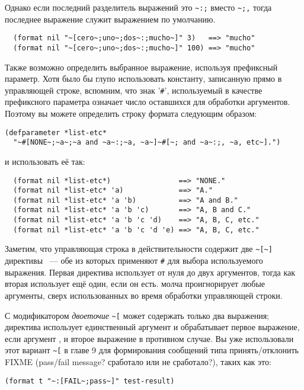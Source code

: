 {Однако если последний разделитель выражений это \lstinline!~:;! вместо \lstinline!~;,!
тогда последнее выражение служит выражением по умолчанию.

\begin{verbatim}
  (format nil "~[cero~;uno~;dos~:;mucho~]" 3)   ==> "mucho"
  (format nil "~[cero~;uno~;dos~:;mucho~]" 100) ==> "mucho"
\end{verbatim}

Также возможно определить выбранное выражение, используя префиксный параметр. Хотя было бы
глупо использовать константу, записанную прямо в управляющей строке, вспомним, что знак
'\lstinline!#!', используемый в качестве префиксного параметра означает число оставшихся
для обработки аргументов. Поэтому вы можете определить строку формата следующим образом:

\begin{lstlisting}
(defparameter *list-etc*
  "~#[NONE~;~a~;~a and ~a~:;~a, ~a~]~#[~; and ~a~:;, ~a, etc~].")
\end{lstlisting}

и использовать её так:

\begin{verbatim}
  (format nil *list-etc*)                ==> "NONE."
  (format nil *list-etc* 'a)             ==> "A."
  (format nil *list-etc* 'a 'b)          ==> "A and B."
  (format nil *list-etc* 'a 'b 'c)       ==> "A, B and C."
  (format nil *list-etc* 'a 'b 'c 'd)    ==> "A, B, C, etc."
  (format nil *list-etc* 'a 'b 'c 'd 'e) ==> "A, B, C, etc."
\end{verbatim}

Заметим, что управляющая строка в действительности содержит две \lstinline!~[~]! директивы
~--- обе из которых применяют \lstinline!#! для выбора используемого выражения. Первая
директива использует от нуля до двух аргументов, тогда как вторая использует ещё один,
если он есть.  молча проигнорирует любые аргументы, сверх использованных во
время обработки управляющей строки.

С модификатором \textit{двоеточие} \lstinline!~[! может содержать только два выражения;
директива использует единственный аргумент и обрабатывает первое выражение, если аргумент
, и второе выражение в противном случае. Вы уже использовали этот вариант
\lstinline!~[! в главе 9 для формирования сообщений типа принять/отклонить FIXME
(pass/fail message? сработало или не сработало?), таких как это:

\begin{lstlisting}
(format t "~:[FAIL~;pass~]" test-result)
\end{lstlisting}

}
